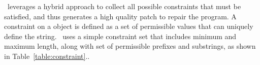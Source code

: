  \tool\ leverages a hybrid
approach to collect all possible constraints that must be satisfied, and thus
generates a high quality patch to repair the program. A constraint on a
 object is defined as a set of permissible values that can uniquely
define the string. \tool\ uses a simple constraint set that includes minimum and maximum
length, along with set of permissible prefixes and substrings, as shown in
Table~\ref{table:constraint}..

